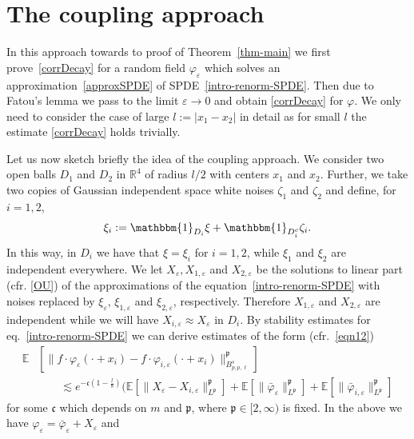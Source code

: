 \documentclass{article}
\newcommand{\assign}{:=}
\begin{document}
\section{The coupling approach}\label{sec-coupling}
In this approach towards to proof of Theorem~\ref{thm-main} we first
prove~\eqref{corrDecay} for a random field $\varphi_{\varepsilon}$ which solves an approximation~\eqref{approxSPDE} of SPDE~\eqref{intro-renorm-SPDE}. Then due to Fatou's lemma we pass to the limit $\varepsilon \rightarrow 0$ and obtain \eqref{corrDecay} for $\varphi$. We only need to consider the case of large $l \assign | x_1 - x_2 |$ in detail as for small $l$ the estimate \eqref{corrDecay} holds trivially.

Let us now sketch briefly the idea of the coupling approach. We consider two open balls $D_1$ and $D_2$ in $\mathbb{R}^4$ of radius $l / 2$ with centers
$x_1$ and $x_2$. Further, we take
two copies of Gaussian independent space white noises $\zeta_1$ and $\zeta_2$
and define, for $i = 1, 2$, \
\[ \xi_i \assign \mathbbm{1}_{D_i} \xi +\mathbbm{1}_{D_i^c} \zeta_i . \]
In this way, in $D_i$ we have that $\xi = \xi_i$ for $i = 1, 2$, while $\xi_1$
and $\xi_2$ are independent everywhere. We let $X_{\varepsilon}, X_{1,
\varepsilon}$ and $X_{2, \varepsilon}$ be the solutions to linear part (cfr.
\eqref{OU}) of the approximations of the equation~\eqref{intro-renorm-SPDE}
with noises replaced by $\xi_{\varepsilon}$, $\xi_{1, \varepsilon}$ and
$\xi_{2, \varepsilon}$, respectively. Therefore $X_{1, \varepsilon}$ and
$X_{2, \varepsilon}$ are independent while we will have $X_{i, \varepsilon}
\approx X_{\varepsilon}$ in $D_i$. By stability estimates for
eq.~\eqref{intro-renorm-SPDE} we can derive estimates of the form
(cfr.~\eqref{eqn12}) \
%
\begin{align*}
	 \mathbb{E} & [\| f \cdot \varphi_{\varepsilon} (\cdot + x_i) - f \cdot
	\varphi_{i, \varepsilon} (\cdot + x_i) \|_{B_{p, p,
			\ell}^s}^{\mathfrak{p}}]  \\
		& \qquad \lesssim  e^{-\mathfrak{c} \left( 1 -
			\frac{l}{8} \right)} (\mathbb{E} [\| X_{\varepsilon} - X_{i, \varepsilon}
		\|_{L^{\mathfrak{p}}}^{\mathfrak{p}}] +\mathbb{E} [\|
		\bar{\varphi}_{\varepsilon} \|_{L^{\mathfrak{p}}}^{\mathfrak{p}}]
		+\mathbb{E} [\| \bar{\varphi}_{i, \varepsilon}
		\|_{L^{\mathfrak{p}}}^{\mathfrak{p}}]
\end{align*}
%
for some $\mathfrak{c}$ which depends on $m$ and $\mathfrak{p}$, where
$\mathfrak{p} \in [2, \infty)$ is fixed. In the above we have
$\varphi_{\varepsilon} = \bar{\varphi}_{\varepsilon} + X_{\varepsilon}$ and
\end{document}
